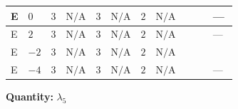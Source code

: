 \documentclass[8pt]{article}
\begin{document}
\begin{landscape}
\begin{longtable}{@{}llcccccc >{\raggedright\arraybackslash}p{0.21\linewidth} >{\raggedright\arraybackslash}p{0.21\linewidth} >{\raggedright\arraybackslash}p{0.21\linewidth}@{}}
\midrule
E & $0$ & $3$ & $\text{N/A}$ & $3$ & $\text{N/A}$ & $2$ & $\text{N/A}$ & \scriptsize\adjustbox{max width=\linewidth}{$\begin{gathered} +4 {\lambda_{HS_1}^{(1)}} {\lambda_5}\end{gathered}$} & \scriptsize\adjustbox{max width=\linewidth}{$\begin{gathered} +4 {\lambda_{HS_2}^{(1)}} {\lambda_5}\end{gathered}$} & --- \\
\midrule
E & $2$ & $3$ & $\text{N/A}$ & $3$ & $\text{N/A}$ & $2$ & $\text{N/A}$ & \scriptsize\adjustbox{max width=\linewidth}{$\begin{gathered} +4 {\lambda_{HS_1}^{(1)}} {\lambda_5}\end{gathered}$} & \scriptsize\adjustbox{max width=\linewidth}{$\begin{gathered} +4 {\lambda_{HS_2}^{(1)}} {\lambda_5}\end{gathered}$} & --- \\
\midrule
E & $-2$ & $3$ & $\text{N/A}$ & $3$ & $\text{N/A}$ & $2$ & $\text{N/A}$ & \scriptsize\adjustbox{max width=\linewidth}{$\begin{gathered} +4 {\lambda_{HS_1}^{(1)}} {\lambda_5}\end{gathered}$} & \scriptsize\adjustbox{max width=\linewidth}{$\begin{gathered} +4 {\lambda_{HS_2}^{(1)}} {\lambda_5}\end{gathered}$} & \scriptsize\adjustbox{max width=\linewidth}{$\begin{gathered} +4 {\lambda_{X_{7}}^{(1)}} \left({\lambda_{X_{12}}}\right)^{*} \\ -2 {\lambda_{X_{7}}^{(2)}} \left({\lambda_{X_{12}}}\right)^{*}\end{gathered}$} \\
\midrule
E & $-4$ & $3$ & $\text{N/A}$ & $3$ & $\text{N/A}$ & $2$ & $\text{N/A}$ & \scriptsize\adjustbox{max width=\linewidth}{$\begin{gathered} +4 {\lambda_{HS_1}^{(1)}} {\lambda_5}\end{gathered}$} & \scriptsize\adjustbox{max width=\linewidth}{$\begin{gathered} +4 {\lambda_{HS_2}^{(1)}} {\lambda_5}\end{gathered}$} & --- \\
\midrule
\bottomrule
\end{longtable}
\clearpage
\noindent\textbf{Quantity: }$\lambda_5$\par\smallskip

\end{landscape}
\end{document}
